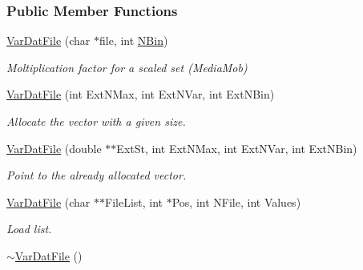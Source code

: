 \subsubsection*{\-Public \-Member \-Functions}
\begin{DoxyCompactItemize}
\item 
\hyperlink{classVarDatFile_a21fde0fe885a9c32bed3f479030b932f}{\-Var\-Dat\-File} (char $\ast$file, int \hyperlink{classVarDatFile_a6a683d7b3c08aafd7a5329b0d293eab6}{\-N\-Bin})
\begin{DoxyCompactList}\small\item\em \-Moltiplication factor for a scaled set (\-Media\-Mob) \end{DoxyCompactList}\item 
\hypertarget{classVarDatFile_aee213a28901788f8039811a1849fd829}{\hyperlink{classVarDatFile_aee213a28901788f8039811a1849fd829}{\-Var\-Dat\-File} (int \-Ext\-N\-Max, int \-Ext\-N\-Var, int \-Ext\-N\-Bin)}\label{classVarDatFile_aee213a28901788f8039811a1849fd829}

\begin{DoxyCompactList}\small\item\em \-Allocate the vector with a given size. \end{DoxyCompactList}\item 
\hypertarget{classVarDatFile_a8a83d164588d4aadbf15e250d29b5a6b}{\hyperlink{classVarDatFile_a8a83d164588d4aadbf15e250d29b5a6b}{\-Var\-Dat\-File} (double $\ast$$\ast$\-Ext\-St, int \-Ext\-N\-Max, int \-Ext\-N\-Var, int \-Ext\-N\-Bin)}\label{classVarDatFile_a8a83d164588d4aadbf15e250d29b5a6b}

\begin{DoxyCompactList}\small\item\em \-Point to the already allocated vector. \end{DoxyCompactList}\item 
\hypertarget{classVarDatFile_ac31e8053d3ade20d6b08259849c87976}{\hyperlink{classVarDatFile_ac31e8053d3ade20d6b08259849c87976}{\-Var\-Dat\-File} (char $\ast$$\ast$\-File\-List, int $\ast$\-Pos, int \-N\-File, int \-Values)}\label{classVarDatFile_ac31e8053d3ade20d6b08259849c87976}

\begin{DoxyCompactList}\small\item\em \-Load list. \end{DoxyCompactList}\item 
\hypertarget{classVarDatFile_acbe3dc1b93a2c0aa2cf310056bef0287}{\hyperlink{classVarDatFile_acbe3dc1b93a2c0aa2cf310056bef0287}{$\sim$\-Var\-Dat\-File} ()}\label{classVarDatFile_acbe3dc1b93a2c0aa2cf310056bef0287}


\end{DoxyCompactItemize}
